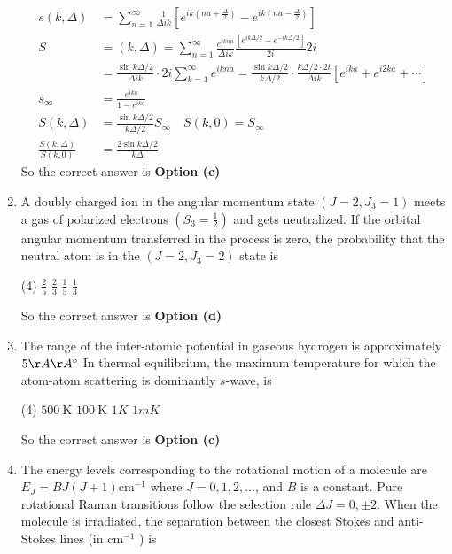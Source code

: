 \begin{enumerate}
\begin{answer}
\begin{align*}
	s(k, \Delta)&=\sum_{n=1}^{\infty} \frac{1}{\Delta i k}\left[e^{i k\left(n a+\frac{\Delta}{2}\right)}-e^{i k\left(n a-\frac{\Delta}{2}\right)}\right] \\
	S&=(k, \Delta)=\sum_{n=1}^{\infty} \frac{e^{i k n a}}{\Delta i k} \frac{\left[e^{i k \Delta / 2}-e^{-i k \Delta / 2}\right]}{2 i} 2 i \\
	&=\frac{\sin k \Delta / 2}{\Delta i k} \cdot 2 i \sum_{k=1}^{\infty} e^{i k n a}=\frac{\sin k \Delta / 2}{k \Delta / 2} \cdot \frac{k \Delta / 2 \cdot 2 i}{\Delta i k}\left[e^{i k a}+e^{i 2 k a}+\cdots\right]\\
	s_{\infty}&=\frac{e^{i k a}}{1-e^{i k a}} \\
	S(k, \Delta)&=\frac{\sin k \Delta / 2}{k \Delta / 2} S_{\infty} \quad S(k, 0)=S_{\infty} \\
	\frac{S(k, \Delta)}{S(k, 0)}&=\frac{2 \sin k \Delta / 2}{k \Delta}
	\end{align*}
	So the correct answer is \textbf{Option (c)}
\end{answer}
\item A doubly charged ion in the angular momentum state $\left(J=2, J_{3}=1\right)$ meets a gas of polarized electrons $\left(S_{3}=\frac{1}{2}\right)$ and gets neutralized. If the orbital angular momentum transferred in the process is zero, the probability that the neutral atom is in the $\left(J=2, J_{3}=2\right)$ state is
 \begin{tasks}(4)
	\task[\textbf{a.}] $\frac{2}{5}$
	\task[\textbf{b.}]$\frac{2}{3}$
	\task[\textbf{c.}]$\frac{1}{5}$
	\task[\textbf{d.}] $\frac{1}{3}$
\end{tasks}
\begin{answer}
	So the correct answer is \textbf{Option (d)}
\end{answer}
\item The range of the inter-atomic potential in gaseous hydrogen is approximately $5 \AA \AA^{\circ}$ In thermal equilibrium, the maximum temperature for which the atom-atom scattering is dominantly $s$-wave, is
 \begin{tasks}(4)
	\task[\textbf{a.}]$500 \mathrm{~K}$
	\task[\textbf{b.}]$100 \mathrm{~K}$
	\task[\textbf{c.}] $1 K$
	\task[\textbf{d.}] $1 m K$
\end{tasks}
\begin{answer}
	So the correct answer is \textbf{Option (c)}
\end{answer}
\item The energy levels corresponding to the rotational motion of a molecule are $E_{J}=B J(J+1) \mathrm{cm}^{-1}$ where $J=0,1,2, \ldots$, and $B$ is a constant. Pure rotational Raman transitions follow the selection rule $\Delta J=0, \pm 2$. When the molecule is irradiated, the separation between the closest Stokes and anti-Stokes lines (in $\mathrm{cm}^{-1}$ ) is

\end{enumerate}

